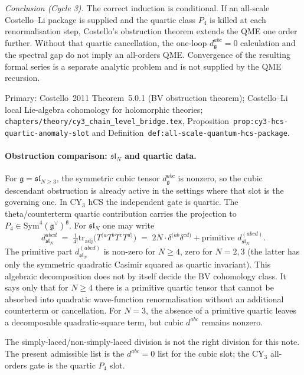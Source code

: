 \documentclass[11pt]{amsart}
\theoremstyle{definition}
\theoremstyle{remark}
\providecommand{\frakg}{\mathfrak{g}}
\providecommand{\fsl}{\mathfrak{sl}}
\providecommand{\Sym}{\mathrm{Sym}}
\providecommand{\tr}{\mathrm{tr}}
\begin{document}
\emph{Conclusion (Cycle 3).}
The correct induction is conditional. If an all-scale Costello--Li
package is supplied and the quartic class $P_4$ is killed at each
renormalisation step, Costello's obstruction theorem extends the QME
one order further. Without that quartic cancellation, the one-loop
$d^{abc}_\frakg=0$ calculation and the spectral gap do not imply an
all-orders QME. Convergence of the resulting formal series is a
separate analytic problem and is not supplied by the QME recursion.

Primary: Costello~2011 Theorem~5.0.1 (BV obstruction theorem);
Costello--Li local Lie-algebra cohomology for holomorphic theories;
\texttt{chapters/theory/cy3\_chain\_level\_bridge.tex},
Proposition~\texttt{prop:cy3-hcs-quartic-anomaly-slot} and
Definition~\texttt{def:all-scale-quantum-hcs-package}.

\paragraph{Obstruction comparison: $\fsl_N$ and quartic data.}
For $\frakg = \fsl_{N \geq 3}$, the symmetric cubic tensor
$d^{abc}_\frakg$ is nonzero, so the cubic descendant obstruction is
already active in the settings where that slot is the governing one.
In CY$_3$ hCS the independent gate is quartic. The theta/counterterm
quartic contribution carries the projection to
$P_4\in\Sym^4(\frakg^\vee)^\frakg$. For $\fsl_N$ one may write
\[
  d^{abcd}_{\fsl_N} \;=\; \tfrac{1}{4!} \tr_{\mathrm{adj}}\!\bigl(
  T^{(a} T^b T^c T^{d)}\bigr) \;=\; 2 N \cdot \delta^{(ab} \delta^{cd)}
  + \text{primitive } d^{(abcd)}_{\fsl_N}.
\]
The primitive part $d^{(abcd)}_{\fsl_N}$ is non-zero for $N \geq 4$,
zero for $N = 2, 3$ (the latter has only the symmetric quadratic
Casimir squared as quartic invariant). This algebraic decomposition
does not by itself decide the BV cohomology class. It says only that
for $N\ge4$ there is a primitive quartic tensor that cannot be absorbed
into quadratic wave-function renormalisation without an additional
counterterm or cancellation. For $N=3$, the absence of a primitive
quartic leaves a decomposable quadratic-square term, but cubic
$d^{abc}$ remains nonzero.

The simply-laced/non-simply-laced division is not the right division
for this note. The present admissible list is the $d^{abc}=0$ list for
the cubic slot; the CY$_3$ all-orders gate is the quartic $P_4$ slot.

\end{document}
